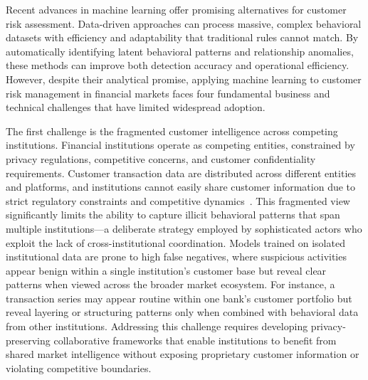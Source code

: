 \documentclass[11pt,english]{article}
\begin{document}
Recent advances in machine learning offer promising alternatives for customer risk assessment. Data-driven approaches can process massive, complex behavioral datasets with efficiency and adaptability that traditional rules cannot match. By automatically identifying latent behavioral patterns and relationship anomalies, these methods can improve both detection accuracy and operational efficiency. However, despite their analytical promise, applying machine learning to customer risk management in financial markets faces four fundamental business and technical challenges that have limited widespread adoption. 

The first challenge is the fragmented customer intelligence across competing institutions. Financial institutions operate as competing entities, constrained by privacy regulations, competitive concerns, and customer confidentiality requirements. Customer transaction data are distributed across different entities and platforms, and institutions cannot easily share customer information due to strict regulatory constraints and competitive dynamics~\parencite{amoako2025exploring}. This fragmented view significantly limits the ability to capture illicit behavioral patterns that span multiple institutions—a deliberate strategy employed by sophisticated actors who exploit the lack of cross-institutional coordination. Models trained on isolated institutional data are prone to high false negatives, where suspicious activities appear benign within a single institution's customer base but reveal clear patterns when viewed across the broader market ecosystem. For instance, a transaction series may appear routine within one bank's customer portfolio but reveal layering or structuring patterns only when combined with behavioral data from other institutions. Addressing this challenge requires developing privacy-preserving collaborative frameworks that enable institutions to benefit from shared market intelligence without exposing proprietary customer information or violating competitive boundaries. 
\end{document}
